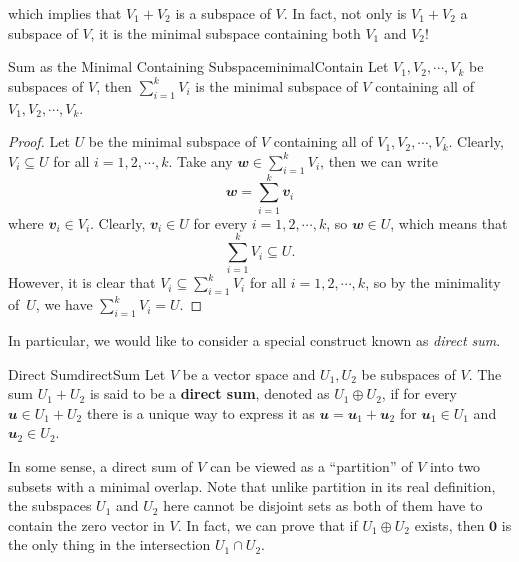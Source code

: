 \documentclass[math, code]{amznotes}
\theoremstyle{remark}
\newcommand{\zero}{\mathbf{0}}
\begin{document}
which implies that $V_1 + V_2$ is a subspace of $V$. In fact, not only is $V_1 +  V_2$ a subspace of $V$, it is the minimal subspace containing both $V_1$ and $V_2$!
\begin{probox}{Sum as the Minimal Containing Subspace}{minimalContain}
    Let $V_1, V_2, \cdots, V_k$ be subspaces of $V$, then $\sum_{i = 1}^{k}V_i$ is the minimal subspace of $V$ containing all of $V_1, V_2, \cdots, V_k$.
    \tcblower
    \begin{proof}
        Let $U$ be the minimal subspace of $V$ containing all of $V_1, V_2, \cdots, V_k$. Clearly, $V_i \subseteq U$ for all $i = 1, 2, \cdots, k$. Take any $\mathbfit{w} \in \sum_{i = 1}^{k}V_i$, then we can write 
        \begin{equation*}
            \mathbfit{w} = \sum_{i = 1}^{k}\mathbfit{v}_i
        \end{equation*}
        where $\mathbfit{v}_i \in V_i$. Clearly, $\mathbfit{v}_i \in U$ for every $i = 1, 2, \cdots, k$, so $\mathbfit{w} \in U$, which means that 
        \begin{equation*}
            \sum_{i = 1}^{k}V_i \subseteq U.
        \end{equation*}
        However, it is clear that $V_i \subseteq \sum_{i = 1}^{k}V_i$ for all $i = 1, 2, \cdots, k$, so by the minimality of~$U$, we have $\sum_{i = 1}^{k}V_i = U$.
    \end{proof}
\end{probox}
In particular, we would like to consider a special construct known as \textit{direct sum}.
\begin{dfnbox}{Direct Sum}{directSum}
    Let $V$ be a vector space and $U_1, U_2$ be subspaces of $V$. The sum $U_1 + U_2$ is said to be a {\color{red} \textbf{direct sum}}, denoted as $U_1 \oplus U_2$, if for every $\mathbfit{u} \in U_1 + U_2$ there is a unique way to express it as $\mathbfit{u} = \mathbfit{u}_1 + \mathbfit{u}_2$ for $\mathbfit{u}_1 \in U_1$ and $\mathbfit{u}_2 \in U_2$.
\end{dfnbox}
In some sense, a direct sum of $V$ can be viewed as a ``partition'' of $V$ into two subsets with a minimal overlap. Note that unlike partition in its real definition, the subspaces $U_1$ and $U_2$ here cannot be disjoint sets as both of them have to contain the zero vector in $V$. In fact, we can prove that if $U_1 \oplus U_2$ exists, then $\zero$ is the only thing in the intersection $U_1 \cap U_2$.
\end{document}
